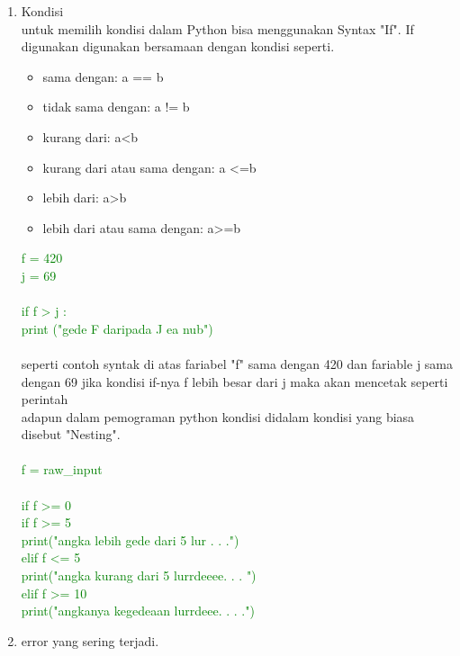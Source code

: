 \documentclass[12pt]{article}
\begin{document}
\begin{enumerate}
\begin{enumerate}
				\end{enumerate}
			\item Kondisi \\
				untuk memilih kondisi dalam Python bisa menggunakan Syntax "If". If digunakan digunakan bersamaan dengan kondisi seperti.
				
					\begin{itemize}
						\item sama dengan: a == b
						\item tidak sama dengan: a != b
						\item kurang dari: a<b
						\item kurang dari atau sama dengan: a <=b
						\item lebih dari: a>b
						\item lebih dari atau sama dengan: a>=b
					\end{itemize}
					\textcolor{green}{
					f = 420\\
					j = 69	\\				
					\\
					if f > j :\\
						print ("gede F daripada J ea nub")\\
						\\
					}
				seperti contoh syntak di atas fariabel "f" sama dengan 420 dan fariable j sama dengan 69 jika kondisi if-nya f lebih besar dari j maka akan mencetak seperti perintah
				\\				
				adapun dalam pemograman python kondisi didalam kondisi yang biasa disebut "Nesting". \\\\
				\textcolor{green}{
					f = raw\_input\\
					\\
					if f >= 0\\
						if f >= 5\\
							print("angka lebih gede dari 5 lur . . .")\\
						elif f <= 5\\
							print("angka kurang dari 5 lurrdeeee. . . ")\\
					elif f >= 10\\
						print("angkanya kegedeaan lurrdeee. . . .")\\
					}
					
			\item error yang sering terjadi.
					

\end{enumerate}
\end{document}
